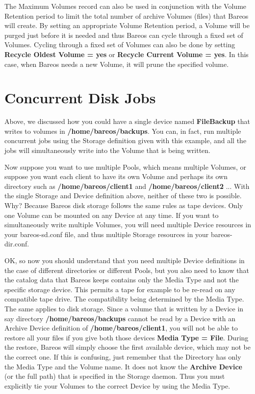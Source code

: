 The Maximum Volumes record can also be used in conjunction with the Volume
Retention period to limit the total number of archive Volumes (files) that
Bareos will create. By setting an appropriate Volume Retention period, a
Volume will be purged just before it is needed and thus Bareos can cycle
through a fixed set of Volumes. Cycling through a fixed set of Volumes can
also be done by setting {\bf Recycle Oldest Volume = yes} or {\bf Recycle
Current Volume = yes}. In this case, when Bareos needs a new Volume, it will
prune the specified volume.

\label{ConcurrentDiskJobs}
\section{Concurrent Disk Jobs}
Above, we discussed how you could have a single device named {\bf
FileBackup} that writes to volumes in {\bf /home/bareos/backups}.
You can, in fact, run multiple concurrent jobs using the
Storage definition given with this example, and all the jobs will
simultaneously write into the Volume that is being written.

Now suppose you want to use multiple Pools, which means multiple
Volumes, or suppose you want each client to have its own Volume
and perhaps its own directory such as {\bf /home/bareos/client1}
and {\bf /home/bareos/client2} ... With the single Storage and Device
definition above, neither of these two is possible.  Why?  Because
Bareos disk storage follows the same rules as tape devices. Only
one Volume can be mounted on any Device at any time. If you want
to simultaneously write multiple Volumes, you will need multiple
Device resources in your bareos-sd.conf file, and thus multiple
Storage resources in your bareos-dir.conf.

OK, so now you should understand that you need multiple Device definitions
in the case of different directories or different Pools, but you also
need to know that the catalog data that Bareos keeps contains only
the Media Type and not the specific storage device.  This permits a tape
for example to be re-read on any compatible tape drive.  The compatibility
being determined by the Media Type.  The same applies to disk storage.
Since a volume that is written by a Device in say directory {\bf
/home/bareos/backups}  cannot be read by a Device with an Archive Device
definition of {\bf /home/bareos/client1}, you will not be able to
restore all your files if you give both those devices
{\bf Media Type = File}. During the restore, Bareos will simply choose
the first available device, which may not be the correct one.  If this
is confusing, just remember that the Directory has only the Media Type
and the Volume name.  It does not know the {\bf Archive Device} (or the
full path) that is specified in the Storage daemon.  Thus you must
explicitly tie your Volumes to the correct Device by using the Media Type.

